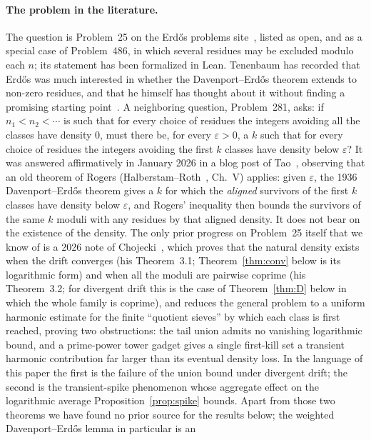 \documentclass[11pt]{article}
\theoremstyle{plain}
\theoremstyle{definition}
\begin{document}
\paragraph{The problem in the literature.}
The question is Problem~25 on the Erd\H{o}s problems
site~\cite{Bloom}, listed as open, and as
a special case of Problem~486, in which several residues may be
excluded modulo each $n$; its statement has been formalized in
Lean.  Tenenbaum has recorded that Erd\H{o}s was much interested
in whether the Davenport--Erd\H{o}s theorem extends to non-zero
residues, and that he himself has thought about it without
finding a promising starting point~\cite{TaoThread}.  A
neighboring question, Problem~281, asks: if $n_1<n_2<\cdots$ is
such that for every choice of residues the integers avoiding all
the classes have density $0$, must there be, for every
$\varepsilon>0$, a $k$ such that for every choice of residues the
integers avoiding the first $k$ classes have density below
$\varepsilon$?  It was answered affirmatively in January 2026 in a blog post
of Tao~\cite{TaoRogers}, observing that an old theorem of Rogers
(Halberstam--Roth~\cite{HaRo66}, Ch.~V) applies: given
$\varepsilon$, the 1936 Davenport--Erd\H{o}s theorem gives a $k$
for which the \emph{aligned} survivors of the first $k$ classes
have density below $\varepsilon$, and Rogers' inequality then
bounds the survivors of the same $k$ moduli with any residues by
that aligned density.  It does not bear on the existence of the
density.  The
only prior progress on Problem~25 itself that we know of is a
2026 note of Chojecki~\cite{Choj26}, which proves that the
natural density exists when the drift converges (his
Theorem~3.1; Theorem~\ref{thm:conv} below is its logarithmic
form) and when all the moduli are pairwise coprime (his
Theorem~3.2; for divergent drift this is the case of
Theorem~\ref{thm:D} below in which the whole family is coprime),
and reduces the
general problem to a uniform harmonic estimate for the finite
``quotient sieves'' by which each class is first reached, proving
two obstructions: the tail union admits no vanishing logarithmic
bound, and a prime-power tower gadget gives a single first-kill
set a transient harmonic contribution far larger than its
eventual density loss.  In the language of this paper the first
is the failure of the union bound under divergent drift; the
second is the transient-spike phenomenon whose aggregate effect
on the logarithmic average Proposition~\ref{prop:spike} bounds.  Apart from those two
theorems we have found no prior source for the results below;
the weighted Davenport--Erd\H{o}s lemma in particular is an
\end{document}
